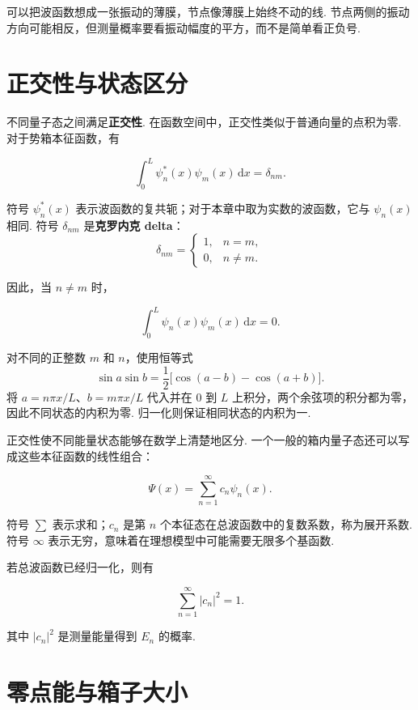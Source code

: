 \documentclass[UTF8,11pt,a4paper,openany]{ctexbook}
\newcommand{\dd}{\,\mathrm d}\newcommand{\Ham}{\hat H}\newcommand{\tr}{\operatorname{Tr}}
\newcommand{\term}[1]{\textbf{#1}}
\begin{document}
\begin{analogybox}
可以把波函数想成一张振动的薄膜，节点像薄膜上始终不动的线. 节点两侧的振动方向可能相反，但测量概率要看振动幅度的平方，而不是简单看正负号. 
\end{analogybox}

\section{正交性与状态区分}

不同量子态之间满足\term{正交性}. 在函数空间中，正交性类似于普通向量的点积为零. 对于势箱本征函数，有

\[
\int_0^L\psi_n^*(x)\psi_m(x)\dd x
=\delta_{nm}.
\]

\begin{notationbox}
符号 $\psi_n^*(x)$ 表示波函数的复共轭；对于本章中取为实数的波函数，它与 $\psi_n(x)$ 相同. 符号 $\delta_{nm}$ 是\term{克罗内克 delta}：
\[
\delta_{nm}=
\begin{cases}
1,&n=m,\\
0,&n\neq m.
\end{cases}
\]
\end{notationbox}

因此，当 $n\neq m$ 时，

\[
\int_0^L\psi_n(x)\psi_m(x)\dd x=0.
\]

\begin{derivationbox}
对不同的正整数 $m$ 和 $n$，使用恒等式
\[
\sin a\sin b
=\frac{1}{2}\bigl[\cos(a-b)-\cos(a+b)\bigr].
\]
将 $a=n\pi x/L$、$b=m\pi x/L$ 代入并在 $0$ 到 $L$ 上积分，两个余弦项的积分都为零，因此不同状态的内积为零. 归一化则保证相同状态的内积为一. 
\end{derivationbox}

正交性使不同能量状态能够在数学上清楚地区分. 一个一般的箱内量子态还可以写成这些本征函数的线性组合：

\[
\Psi(x)=\sum_{n=1}^{\infty}c_n\psi_n(x).
\]

\begin{notationbox}
符号 $\sum$ 表示求和；$c_n$ 是第 $n$ 个本征态在总波函数中的复数系数，称为展开系数. 符号 $\infty$ 表示无穷，意味着在理想模型中可能需要无限多个基函数. 
\end{notationbox}

若总波函数已经归一化，则有

\[
\sum_{n=1}^{\infty}|c_n|^2=1.
\]

其中 $|c_n|^2$ 是测量能量得到 $E_n$ 的概率. 

\section{零点能与箱子大小}
\end{document}
